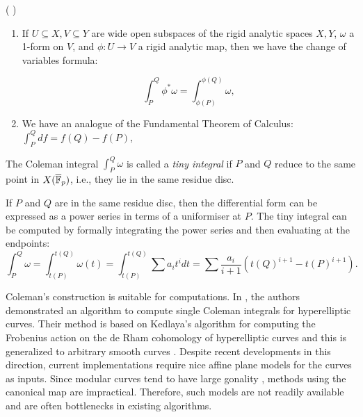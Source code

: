 \begin{theorem}{( \cite{Coleman1,coleman85} )}
\begin{enumerate}
        \item If $U \subseteq X, V \subseteq Y $ are wide open subspaces of the rigid analytic spaces $X,Y$, $\omega$ a 1-form on $V$, and $\phi:U \rightarrow V$ a rigid analytic map, then we have the change of variables formula:
        
        \begin{equation*}
            \int_P^Q \phi^* \omega = \int_{\phi(P)}^{\phi(Q)} \omega,
        \end{equation*}
        \item We have an analogue of the Fundamental Theorem of Calculus: $\int_P^Q df = f(Q) - f(P)$,

\end{enumerate}
\end{theorem}

\begin{defn}\label{def:tiny_integral}
The Coleman integral $\int_P^Q \omega$ is called a \emph{tiny integral} if $P$ and $Q$ reduce to the same point in $X(\overline{\mathbb{F}}_p)$, i.e., they lie in the same residue disc.

\end{defn}


If $P$ and $Q$ are in the same residue disc, then the differential form can be expressed as a power series in terms of a uniformiser at $P$. The tiny integral can be computed by formally integrating the power series and then evaluating at the endpoints: \[\int_P^Q \omega = \int_{t(P)}^{t(Q)} \omega(t) = \int_{t(P)}^{t(Q)}\sum a_i t^i dt= \sum \frac{a_i}{i+1} (t(Q)^{i+1} - t(P)^{i+1}).\]


Coleman’s construction is suitable for computations. In \cite{BBK10}, the authors demonstrated an algorithm to compute single Coleman integrals for hyperelliptic curves. Their method is based on Kedlaya's algorithm for computing the Frobenius action on the de Rham cohomology of hyperelliptic curves \cite{Kedlaya_coho_hyper} and this is generalized to arbitrary smooth curves \cite{balatuit, Tui16, Tui17}. Despite recent developments in this direction, current implementations require nice affine plane models for the curves as inputs. Since modular curves tend to have large gonality \cite{gonality}, methods using the canonical map \cite{Galbraith_1996} are impractical. Therefore, such models are not readily available and are often bottlenecks in existing algorithms.